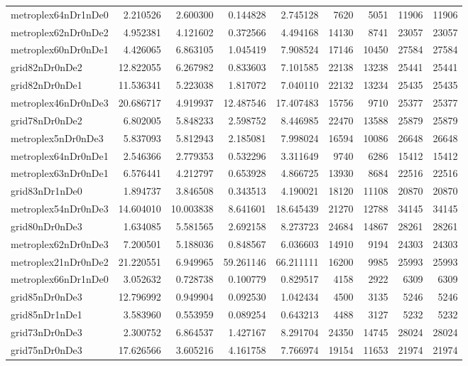 \begin{longtable}{|l|r|r|r|r|r|r|r|r|}
metroplex64nDr1nDe0 & 2.210526 & 2.600300 & 0.144828 & 2.745128 & 7620 & 5051 & 11906 & 11906 \\
metroplex62nDr0nDe2 & 4.952381 & 4.121602 & 0.372566 & 4.494168 & 14130 & 8741 & 23057 & 23057 \\
metroplex60nDr0nDe1 & 4.426065 & 6.863105 & 1.045419 & 7.908524 & 17146 & 10450 & 27584 & 27584 \\
grid82nDr0nDe2 & 12.822055 & 6.267982 & 0.833603 & 7.101585 & 22138 & 13238 & 25441 & 25441 \\
grid82nDr0nDe1 & 11.536341 & 5.223038 & 1.817072 & 7.040110 & 22132 & 13234 & 25435 & 25435 \\
metroplex46nDr0nDe3 & 20.686717 & 4.919937 & 12.487546 & 17.407483 & 15756 & 9710 & 25377 & 25377 \\
grid78nDr0nDe2 & 6.802005 & 5.848233 & 2.598752 & 8.446985 & 22470 & 13588 & 25879 & 25879 \\
metroplex5nDr0nDe3 & 5.837093 & 5.812943 & 2.185081 & 7.998024 & 16594 & 10086 & 26648 & 26648 \\
metroplex64nDr0nDe1 & 2.546366 & 2.779353 & 0.532296 & 3.311649 & 9740 & 6286 & 15412 & 15412 \\
metroplex63nDr0nDe1 & 6.576441 & 4.212797 & 0.653928 & 4.866725 & 13930 & 8684 & 22516 & 22516 \\
grid83nDr1nDe0 & 1.894737 & 3.846508 & 0.343513 & 4.190021 & 18120 & 11108 & 20870 & 20870 \\
metroplex54nDr0nDe3 & 14.604010 & 10.003838 & 8.641601 & 18.645439 & 21270 & 12788 & 34145 & 34145 \\
grid80nDr0nDe3 & 1.634085 & 5.581565 & 2.692158 & 8.273723 & 24684 & 14867 & 28261 & 28261 \\
metroplex62nDr0nDe3 & 7.200501 & 5.188036 & 0.848567 & 6.036603 & 14910 & 9194 & 24303 & 24303 \\
metroplex21nDr0nDe2 & 21.220551 & 6.949965 & 59.261146 & 66.211111 & 16200 & 9985 & 25993 & 25993 \\
metroplex66nDr1nDe0 & 3.052632 & 0.728738 & 0.100779 & 0.829517 & 4158 & 2922 & 6309 & 6309 \\
grid85nDr0nDe3 & 12.796992 & 0.949904 & 0.092530 & 1.042434 & 4500 & 3135 & 5246 & 5246 \\
grid85nDr1nDe1 & 3.583960 & 0.553959 & 0.089254 & 0.643213 & 4488 & 3127 & 5232 & 5232 \\
grid73nDr0nDe3 & 2.300752 & 6.864537 & 1.427167 & 8.291704 & 24350 & 14745 & 28024 & 28024 \\
grid75nDr0nDe3 & 17.626566 & 3.605216 & 4.161758 & 7.766974 & 19154 & 11653 & 21974 & 21974 \\

\end{longtable}
